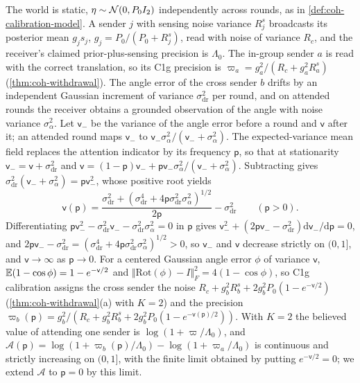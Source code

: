 The world is static, $\eta\sim\mathcal{N}(0,P_0I_2)$ independently across rounds, as in \cref{def:coh-calibration-model}. A sender $j$ with sensing noise variance $R^s_j$ broadcasts its posterior mean $g_js_j$, $g_j=P_0/(P_0+R^s_j)$, read with noise of variance $R_c$, and the receiver's claimed prior-plus-sensing precision is $\Lambda_0$. The in-group sender $a$ is read with the correct translation, so its C1g precision is $\varpi_a=g_a^2/(R_c+g_a^2R^s_a)$ (\cref{thm:coh-withdrawal}). The angle error of the cross sender $b$ drifts by an independent Gaussian increment of variance $\sigma^2_{\mathrm{dr}}$ per round, and on attended rounds the receiver obtains a grounded observation of the angle with noise variance $\sigma_\alpha^2$. Let $\mathsf v_-$ be the variance of the angle error before a round and $\mathsf v$ after it; an attended round maps $\mathsf v_-$ to $\mathsf v_-\sigma_\alpha^2/(\mathsf v_-+\sigma_\alpha^2)$. The expected-variance mean field replaces the attention indicator by its frequency $\mathsf p$, so that at stationarity $\mathsf v_-=\mathsf v+\sigma^2_{\mathrm{dr}}$ and $\mathsf v=(1-\mathsf p)\mathsf v_-+\mathsf p\mathsf v_-\sigma_\alpha^2/(\mathsf v_-+\sigma_\alpha^2)$. Subtracting gives $\sigma^2_{\mathrm{dr}}(\mathsf v_-+\sigma_\alpha^2)=\mathsf p\mathsf v_-^2$, whose positive root yields
\begin{equation*}
\mathsf v(\mathsf p)=\frac{\sigma^2_{\mathrm{dr}}+(\sigma^4_{\mathrm{dr}}+4\mathsf p\sigma^2_{\mathrm{dr}}\sigma_\alpha^2)^{1/2}}{2\mathsf p}-\sigma^2_{\mathrm{dr}}\qquad(\mathsf p>0).
\end{equation*}
Differentiating $\mathsf p\mathsf v_-^2-\sigma^2_{\mathrm{dr}}\mathsf v_--\sigma^2_{\mathrm{dr}}\sigma_\alpha^2=0$ in $\mathsf p$ gives $\mathsf v_-^2+(2\mathsf p\mathsf v_--\sigma^2_{\mathrm{dr}})\mathrm d\mathsf v_-/\mathrm d\mathsf p=0$, and $2\mathsf p\mathsf v_--\sigma^2_{\mathrm{dr}}=(\sigma^4_{\mathrm{dr}}+4\mathsf p\sigma^2_{\mathrm{dr}}\sigma_\alpha^2)^{1/2}>0$, so $\mathsf v_-$ and $\mathsf v$ decrease strictly on $(0,1]$, and $\mathsf v\to\infty$ as $\mathsf p\to0$. For a centered Gaussian angle error $\phi$ of variance $\mathsf v$, $\mathbb{E}(1-\cos\phi)=1-e^{-\mathsf v/2}$ and $\Vert\mathrm{Rot}(\phi)-I\Vert_F^2=4(1-\cos\phi)$, so C1g calibration assigns the cross sender the noise $R_c+g_b^2R^s_b+2g_b^2P_0(1-e^{-\mathsf v/2})$ (\cref{thm:coh-withdrawal}(a) with $K=2$) and the precision $\varpi_b(\mathsf p)=g_b^2/(R_c+g_b^2R^s_b+2g_b^2P_0(1-e^{-\mathsf v(\mathsf p)/2}))$. With $K=2$ the believed value of attending one sender is $\log(1+\varpi/\Lambda_0)$, and $\mathcal A(\mathsf p)=\log(1+\varpi_b(\mathsf p)/\Lambda_0)-\log(1+\varpi_a/\Lambda_0)$ is continuous and strictly increasing on $(0,1]$, with the finite limit obtained by putting $e^{-\mathsf v/2}=0$; we extend $\mathcal A$ to $\mathsf p=0$ by this limit.

